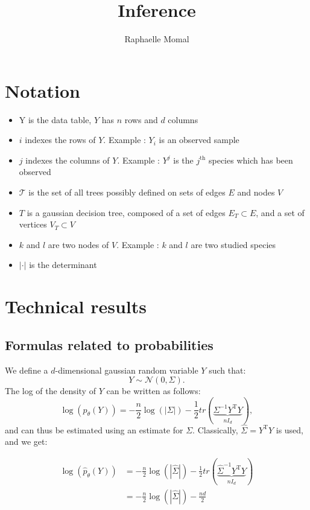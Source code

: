 \documentclass[a4paper,11pt]{article}
\title{Inference}
\author{Raphaelle Momal}
\begin{document}
\maketitle
\tableofcontents

\section{Notation}
\begin{itemize}
 \item Y is the data table, $Y$ has $n$ rows and $d$ columns
 \item $i$ indexes the rows of $Y$. Example : $Y_i$ is an observed sample
 \item $j$ indexes the columns of $Y$. Example : $Y^j$ is the $j^\text{th}$ species which has been observed
  \item $\mathcal{T}$ is the set of all trees possibly defined on sets of edges $E$ and nodes $V$
  \item $T$ is a gaussian decision tree, composed of a set of edges $E_T\subset E$, and a set of vertices $V_T \subset V$
 \item $k$ and $l$ are two nodes of $V$. Example : $k$ and $l$ are two studied species
 \item $|\cdot|$ is the determinant
\end{itemize}

\section{Technical results}
  \subsection{Formulas related to probabilities}
  We define a $d$-dimensional gaussian random variable $Y$ such that:
  \[ Y \sim \mathcal{N}(0,\Sigma).\]
 The log of the density of $Y$ can be written as follows:
 \[ \log(p_\theta(Y)) = -\frac{n}{2}\log(|\Sigma|) - \frac{1}{2}tr(\underbrace{\Sigma^{-1}Y^{\text{T}}Y}_{nI_d}),\]
 and can thus be estimated using an estimate for  $\Sigma$. Classically, $ \hat{\Sigma} =Y^{\text{T}}Y$ is used, and we get:
  
   \begin{align*}
   \log(\hat{p}_\theta(Y)) &= -\frac{n}{2}\log(|\hat{\Sigma}|) - \frac{1}{2}tr(\underbrace{\hat{\Sigma}^{-1}Y^{\text{T}}Y}_{nI_d})\\
    &=-\frac{n}{2}\log(|\hat{\Sigma}|)-\frac{nd}{2}
  \end{align*}
 
\end{document}
